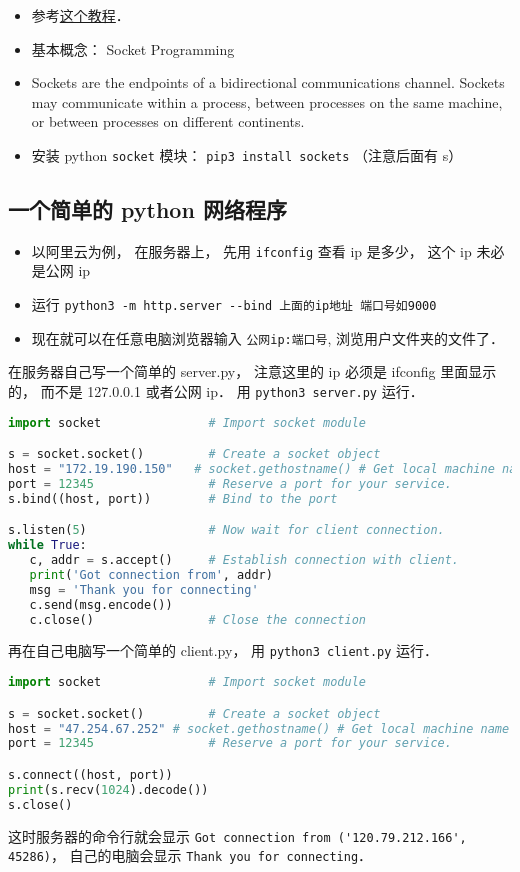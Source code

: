 
\begin{itemize}
\item 参考\href{https://www.tutorialspoint.com/python/python_networking.htm}{这个教程}．
\item 基本概念： Socket Programming
\item Sockets are the endpoints of a bidirectional communications channel. Sockets may communicate within a process, between processes on the same machine, or between processes on different continents.
\item 安装 python \verb|socket| 模块： \verb|pip3 install sockets| （注意后面有 s）
\end{itemize}

\subsection{一个简单的 python 网络程序}
\begin{itemize}
\item 以阿里云为例， 在服务器上， 先用 \verb|ifconfig| 查看 ip 是多少， 这个 ip 未必是公网 ip
\item 运行 \verb|python3 -m http.server --bind 上面的ip地址 端口号如9000|
\item 现在就可以在任意电脑浏览器输入 \verb|公网ip:端口号|, 浏览用户文件夹的文件了．
\end{itemize}

在服务器自己写一个简单的 server.py， 注意这里的 ip 必须是 ifconfig 里面显示的， 而不是 127.0.0.1 或者公网 ip． 用 \verb|python3 server.py| 运行．
\begin{lstlisting}[language=python, caption=server.py]
import socket               # Import socket module

s = socket.socket()         # Create a socket object
host = "172.19.190.150"   # socket.gethostname() # Get local machine name
port = 12345                # Reserve a port for your service.
s.bind((host, port))        # Bind to the port

s.listen(5)                 # Now wait for client connection.
while True:
   c, addr = s.accept()     # Establish connection with client.
   print('Got connection from', addr)
   msg = 'Thank you for connecting'
   c.send(msg.encode())
   c.close()                # Close the connection
\end{lstlisting}

再在自己电脑写一个简单的 client.py， 用 \verb|python3 client.py| 运行．
\begin{lstlisting}[language=python, caption=client.py]
import socket               # Import socket module

s = socket.socket()         # Create a socket object
host = "47.254.67.252" # socket.gethostname() # Get local machine name
port = 12345                # Reserve a port for your service.

s.connect((host, port))
print(s.recv(1024).decode())
s.close()
\end{lstlisting}

这时服务器的命令行就会显示 \verb|Got connection from ('120.79.212.166', 45286)|， 自己的电脑会显示 \verb|Thank you for connecting|．

